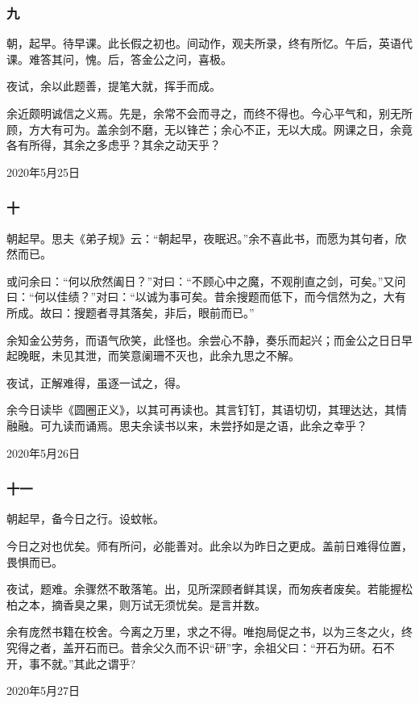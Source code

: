 \documentclass[a5paper]{ctexart}
\begin{document}
	\subsubsection{九}
	朝，起早。待早课。此长假之初也。间动作，观夫所录，终有所忆。午后，英语代课。难答其问，愧。后，答金公之问，喜极。
	
	夜试，余以此题善，提笔大就，挥手而成。
	
	余近颇明诚信之义焉。先是，余常不会而寻之，而终不得也。今心平气和，别无所顾，方大有可为。盖余剑不磨，无以锋芒；余心不正，无以大成。网课之日，余竟各有所得，其余之多虑乎？其余之动天乎？
	\begin{flushright}
		2020年5月25日
	\end{flushright}
	
	\subsubsection{十}
	朝起早。思夫《弟子规》云：“朝起早，夜眠迟。”余不喜此书，而愿为其句者，欣然而已。
	
	或问余曰：“何以欣然阖日？”对曰：“不顾心中之魔，不观削直之剑，可矣。”又问曰：“何以佳绩？”对曰：“以诚为事可矣。昔余搜题而低下，而今信然为之，大有所成。故曰：搜题者寻其落矣，非后，眼前而已。”
	
	余知金公劳务，而语气欣笑，此怪也。余尝心不静，奏乐而起兴；而金公之日日早起晚眠，未见其泄，而笑意阑珊不灭也，此余九思之不解。
	
	夜试，正解难得，虽逐一试之，得。
	
	余今日读毕《圆圈正义》，以其可再读也。其言钉钉，其语切切，其理达达，其情融融。可九读而诵焉。思夫余读书以来，未尝抒如是之语，此余之幸乎？
	\begin{flushright}
		2020年5月26日
	\end{flushright}
	
	\subsubsection{十一}
	朝起早，备今日之行。设蚊帐。
	
	今日之对也优矣。师有所问，必能善对。此余以为昨日之更成。盖前日难得位置，畏惧而已。
	
	夜试，题难。余骤然不敢落笔。出，见所深顾者鲜其误，而匆疾者废矣。若能握松柏之本，摘香臭之果，则万试无须忧矣。是言并数。
	
	余有庞然书籍在校舍。今离之万里，求之不得。唯抱局促之书，以为三冬之火，终究得之者，盖开石而已。昔余父久而不识“研”字，余祖父曰：“开石为研。石不开，事不就。”其此之谓乎?
	\begin{flushright}
		2020年5月27日
	\end{flushright}
	
\end{document}
